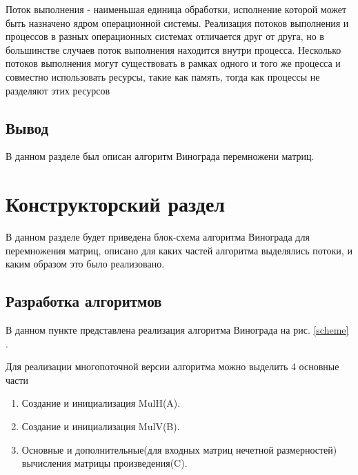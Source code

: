 \documentclass[12pt, a4paper]{report}
\begin{document}
	\vspace{0.3cm}Поток выполнения - наименьшая единица обработки, исполнение которой может быть назначено ядром операционной системы. Реализация потоков выполнения и процессов в разных операционных системах отличается друг от друга, но в большинстве случаев поток выполнения находится внутри процесса. Несколько потоков выполнения могут существовать в рамках одного и того же процесса и совместно использовать ресурсы, такие как память, тогда как процессы не разделяют этих ресурсов\cite{bmstu}
	
	\section{Вывод}
	
	В данном разделе был описан алгоритм Винограда перемножени матриц.
	

	\chapter{Конструкторский раздел}
	
	\vspace{-0.6cm}\hspace{0.6cm} В данном разделе будет приведена блок-схема алгоритма Винограда для перемножения матриц, описано для каких частей алгоритма выделялись потоки, и каким образом это было реализовано.
	
	\section{Разработка алгоритмов}
	
	\hspace{0.6cm}В данном пункте представлена реализация алгоритма Винограда на рис. \ref{scheme} \cite{scheme}. 
	
	\newpage
	



	\newpage
	
	Для реализации многопоточной версии алгоритма можно выделить 4 основные части
	
	\begin{enumerate}
		\item Создание и инициализация MulH(A).
		\item Создание и инициализация MulV(B).
		\item Основные и дополнительные(для входных матриц нечетной размерностей) вычисления матрицы произведения(C).
	\end{enumerate}
\end{document}
